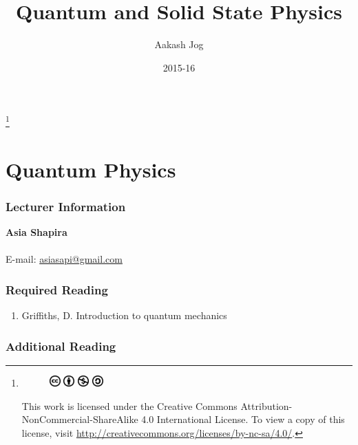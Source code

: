 \documentclass[fleqn, a4paper, 12pt, twoside]{article}
\title{Quantum and Solid State Physics}
\author{Aakash Jog}
\date{2015-16}
\theoremstyle{definition}
\theoremstyle{theorem}
\newcommand\blfootnote[1]{%
	\begingroup
	\renewcommand\thefootnote{}\footnote{#1}%
	\addtocounter{footnote}{-1}%
	\endgroup
}
\begin{document}
\maketitle

\blfootnote
{	
	\begin{figure}[H]
		\includegraphics[height = 12pt]{cc.eps}
		\includegraphics[height = 12pt]{by.eps}
		\includegraphics[height = 12pt]{nc.eps}
		\includegraphics[height = 12pt]{sa.eps}
	\end{figure}
	This work is licensed under the Creative Commons Attribution-NonCommercial-ShareAlike 4.0 International License. To view a copy of this license, visit \url{http://creativecommons.org/licenses/by-nc-sa/4.0/}.
} %

\tableofcontents

\newpage
\part{Quantum Physics}

\section{Lecturer Information}

\textbf{Asia Shapira}\\
~\\
E-mail: \href{mailto:asiasapi@gmail.com}{asiasapi@gmail.com}\\

\section{Required Reading}

\begin{enumerate}
	\item Griffiths, D. Introduction to quantum mechanics
\end{enumerate}

\section{Additional Reading}
\end{document}
